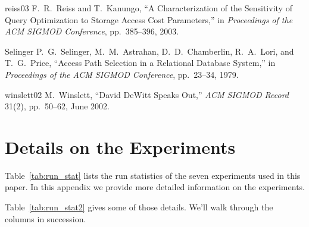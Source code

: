 \documentclass[prodmode,acmtods]{acmsmall}
\begin{document}
\begin{thebibliography}{99}
\bibitem
{reiss03}
F.~R.~Reiss and T.~Kanungo, ``A Characterization of the Sensitivity of Query
Optimization to Storage Access Cost Parameters,'' in {\em Proceedings of the
  ACM SIGMOD Conference}, pp.~385--396, 2003.

\bibitem
{Selinger}
P.~G.~Selinger, M.~M.~Astrahan, D.~D.~Chamberlin, R.~A.~Lori, and
T.~G.~Price, ``Access Path Selection in a Relational Database System,''
in {\em Proceedings of the ACM SIGMOD Conference}, pp.~23--34, 1979.

\bibitem
{winslett02}
M.~Winslett, ``David DeWitt Speaks Out,'' {\em ACM SIGMOD
  Record} 31(2), pp.~50--62, June 2002. 



\end{thebibliography}

\newpage
\appendix
\section{Details on the Experiments}\label{sec:app}
Table~\ref{tab:run_stat} lists the run statistics of the seven experiments
  used in this paper. In this appendix we provide more detailed information
  on the experiments.

Table~\ref{tab:run_stat2} gives some of those details. We'll walk through
the columns in succession.
\end{document}

